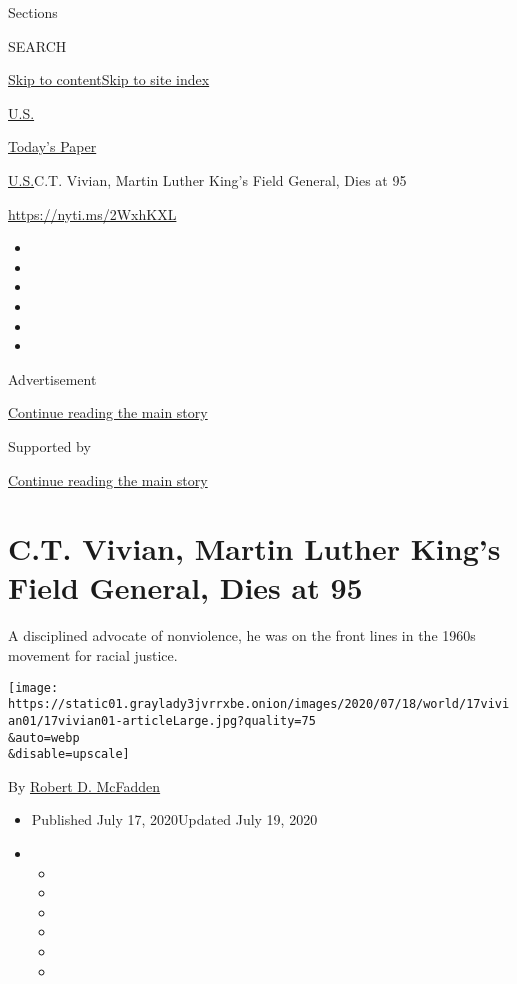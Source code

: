 Sections

SEARCH

\protect\hyperlink{site-content}{Skip to
content}\protect\hyperlink{site-index}{Skip to site index}

\href{https://www.nytimes3xbfgragh.onion/section/us}{U.S.}

\href{https://myaccount.nytimes3xbfgragh.onion/auth/login?response_type=cookie\&client_id=vi}{}

\href{https://www.nytimes3xbfgragh.onion/section/todayspaper}{Today's
Paper}

\href{/section/us}{U.S.}\textbar{}C.T. Vivian, Martin Luther King's
Field General, Dies at 95

\url{https://nyti.ms/2WxhKXL}

\begin{itemize}
\item
\item
\item
\item
\item
\item
\end{itemize}

Advertisement

\protect\hyperlink{after-top}{Continue reading the main story}

Supported by

\protect\hyperlink{after-sponsor}{Continue reading the main story}

\hypertarget{ct-vivian-martin-luther-kings-field-general-dies-at-95}{%
\section{C.T. Vivian, Martin Luther King's Field General, Dies at
95}\label{ct-vivian-martin-luther-kings-field-general-dies-at-95}}

A disciplined advocate of nonviolence, he was on the front lines in the
1960s movement for racial justice.

\texttt{[image: https://static01.graylady3jvrrxbe.onion/images/2020/07/18/world/17vivian01/17vivian01-articleLarge.jpg?quality=75\\\&auto=webp\\\&disable=upscale]}

By \href{https://www.nytimes3xbfgragh.onion/by/robert-d-mcfadden}{Robert
D. McFadden}

\begin{itemize}
\item
  Published July 17, 2020Updated July 19, 2020
\item
  \begin{itemize}
  \item
  \item
  \item
  \item
  \item
  \item
  \end{itemize}
\end{itemize}

